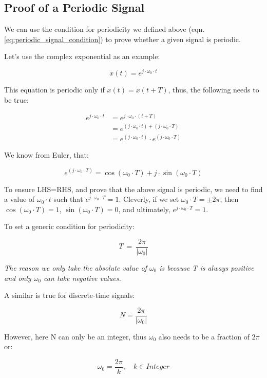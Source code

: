 \documentclass[letterpaper,12pt]{article}
\begin{document}
\subsection{Proof of a Periodic Signal}
We can use the condition for periodicity we defined above
(eqn.\ref{eq:periodic_signal_condition}) to prove whether a given signal is
periodic.

Let's use the complex exponential as an example:

\[x(t) = e^{j\cdot \omega_0 \cdot t}\]

This equation is periodic only if \(x(t) = x(t + T)\), thus, the following
needs to be true:

\begin{equation*}
    \begin{aligned}
        e^{j\cdot \omega_0 \cdot t} & = e^{j\cdot \omega_0 \cdot (t + T)}                                \\
                                    & = e^{(j\cdot \omega_0 \cdot t) + (j\cdot \omega_0 \cdot T)}        \\
                                    & = e^{(j\cdot \omega_0 \cdot t)}\cdot e^{(j\cdot \omega_0 \cdot T)}
    \end{aligned}
\end{equation*}

We know from Euler, that:

\[e^{(j\cdot \omega_0 \cdot T)} = \cos(\omega_0\cdot T) + j\cdot \sin(\omega_0\cdot T)\]

To ensure LHS=RHS, and prove that the above signal is periodic, we need to find
a value of $\omega_0\cdot t$ such that $e^{j\cdot \omega_0 \cdot T} = 1$.
Cleverly, if we set $\omega_0\cdot T = \pm2\pi$, then $\cos(\omega_0\cdot T) =
    1$, $\sin(\omega_0\cdot T) = 0$, and ultimately, $e^{j\cdot \omega_0 \cdot T} =
    1$.

To set a generic condition for periodicity:

\[T\ =\ \frac{2\pi}{\left|\omega_{0}\right|}\]

\textit{The reason we only take the absolute value of $\omega_0$ is because T is always positive and only $\omega_0$ can take negative values.}

A similar is true for discrete-time signals:

\[N = \frac{2\pi}{|\omega_0|}\]

However, here N can only be an integer, thus $\omega_0$ also needs to be a
fraction of $2\pi$ or:

\[\omega_0 = \frac{2\pi}{k}, \quad k \in Integer\]
\end{document}
